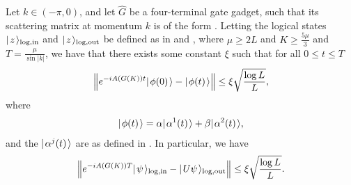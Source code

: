 \documentclass[../thesis-main/thesis-main]{subfiles}
\begin{document}
\begin{lemma}
\label{lem:single_qubit_encoded_computation}
  Let $k\in (-\pi,0)$, and let $\widehat{G}$ be a four-terminal gate gadget, such that its scattering matrix at momentum $k$ is of the form .  Letting the logical states $|\mspace{2mu} z \mspace{2mu} \rangle_{\text{log},\text{in}}$ and $|\mspace{2mu} z \mspace{2mu} \rangle_{\text{log},\text{out}}$ be defined as in  and , where $\mu \geq 2L $ and $K \geq \frac{5 \mu}{3}$ and $T = \frac{\mu}{\sin |k|}$, we have that there exists some constant $\xi$ such that for all $0 \leq t \leq T$
\begin{align}
  \Big\Vert e^{-i A(G(K))t} |\mspace{2mu} \phi(0) \mspace{2mu} \rangle - |\mspace{2mu} \phi(t) \mspace{2mu} \rangle \Big\Vert \leq \xi \sqrt{\frac{\log L}{L}},
\end{align}
where
\begin{align}
  |\mspace{2mu} \phi(t) \mspace{2mu} \rangle = \alpha |\mspace{2mu} \alpha^{1}(t) \mspace{2mu} \rangle + \beta |\mspace{2mu} \alpha^2(t) \mspace{2mu} \rangle,
\end{align}
and the $|\mspace{2mu} \alpha^j(t) \mspace{2mu} \rangle$ are as defined in .  In particular, we have
\begin{align}
  \Big\Vert e^{-i A(G(K)) T} |\mspace{2mu} \psi \mspace{2mu} \rangle_{\text{log},\text{in}} - |\mspace{2mu} U\psi \mspace{2mu} \rangle_{\text{log},\text{out}} \Big\Vert \leq \xi \sqrt{\frac{\log L}{L}}.
\end{align}
\end{lemma}
\end{document}
